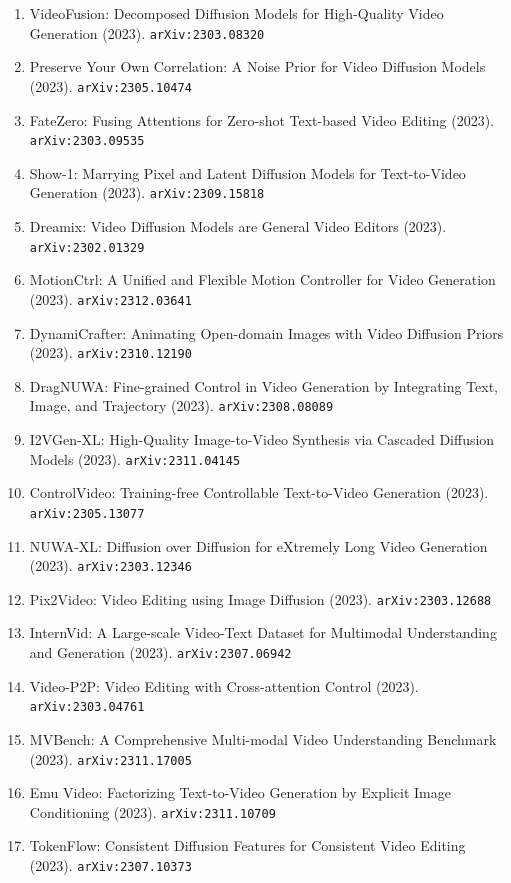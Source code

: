 \documentclass[11pt]{article}
\begin{document}
\begin{enumerate}
  Text-to-Image Diffusion Models (2023). \texttt{arXiv:2302.08453}
  \item VideoFusion: Decomposed Diffusion Models for High-Quality Video
  Generation (2023). \texttt{arXiv:2303.08320}
  \item Preserve Your Own Correlation: A Noise Prior for Video Diffusion Models (2023). \texttt{arXiv:2305.10474}
  \item FateZero: Fusing Attentions for Zero-shot Text-based Video Editing (2023). \texttt{arXiv:2303.09535}
  \item Show-1: Marrying Pixel and Latent Diffusion Models for Text-to-Video Generation (2023). \texttt{arXiv:2309.15818}
  \item Dreamix: Video Diffusion Models are General Video Editors (2023). \texttt{arXiv:2302.01329}
  \item MotionCtrl: A Unified and Flexible Motion Controller for Video
  Generation (2023). \texttt{arXiv:2312.03641}
  \item DynamiCrafter: Animating Open-domain Images with Video Diffusion Priors (2023). \texttt{arXiv:2310.12190}
  \item DragNUWA: Fine-grained Control in Video Generation by Integrating Text,
  Image, and Trajectory (2023). \texttt{arXiv:2308.08089}
  \item I2VGen-XL: High-Quality Image-to-Video Synthesis via Cascaded Diffusion
  Models (2023). \texttt{arXiv:2311.04145}
  \item ControlVideo: Training-free Controllable Text-to-Video Generation (2023). \texttt{arXiv:2305.13077}
  \item NUWA-XL: Diffusion over Diffusion for eXtremely Long Video Generation (2023). \texttt{arXiv:2303.12346}
  \item Pix2Video: Video Editing using Image Diffusion (2023). \texttt{arXiv:2303.12688}
  \item InternVid: A Large-scale Video-Text Dataset for Multimodal Understanding
  and Generation (2023). \texttt{arXiv:2307.06942}
  \item Video-P2P: Video Editing with Cross-attention Control (2023). \texttt{arXiv:2303.04761}
  \item MVBench: A Comprehensive Multi-modal Video Understanding Benchmark (2023). \texttt{arXiv:2311.17005}
  \item Emu Video: Factorizing Text-to-Video Generation by Explicit Image
  Conditioning (2023). \texttt{arXiv:2311.10709}
  \item TokenFlow: Consistent Diffusion Features for Consistent Video Editing (2023). \texttt{arXiv:2307.10373}

\end{enumerate}
\end{document}
